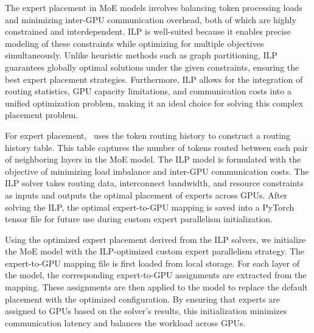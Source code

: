 %
The expert placement in MoE models involves balancing token processing loads and minimizing inter-GPU communication overhead, both of which are highly constrained and interdependent. 
%
ILP is well-suited because it enables precise modeling of these constraints while optimizing for multiple objectives simultaneously. 
%
Unlike heuristic methods such as graph partitioning, ILP guarantees globally optimal solutions under the given constraints, ensuring the best expert placement strategies. 
%
Furthermore, ILP allows for the integration of routing statistics, GPU capacity limitations, and communication costs into a unified optimization problem, making it an ideal choice for solving this complex placement problem.


For expert placement, \expertune~uses the token routing history to construct a routing history table. 
%
This table captures the number of tokens routed between each pair of neighboring layers in the MoE model. 
%
The ILP model is formulated with the objective of minimizing load imbalance and inter-GPU communication costs. 
%
The ILP solver takes routing data, interconnect bandwidth, and resource constraints as inputs and outputs the optimal placement of experts across GPUs. 
%
After solving the ILP, the optimal expert-to-GPU mapping is saved into a PyTorch tensor file for future use during custom expert parallelism initialization.



%
Using the optimized expert placement derived from the ILP solvers, we initialize the MoE model with the ILP-optimized custom expert parallelism strategy.
%
The expert-to-GPU mapping file is first loaded from local storage. 
%
For each layer of the model, the corresponding expert-to-GPU assignments are extracted from the mapping. 
%
These assignments are then applied to the model to replace the default placement with the optimized configuration.
%
By ensuring that experts are assigned to GPUs based on the solver’s results, this initialization minimizes communication latency and balances the workload across GPUs.


%

    
